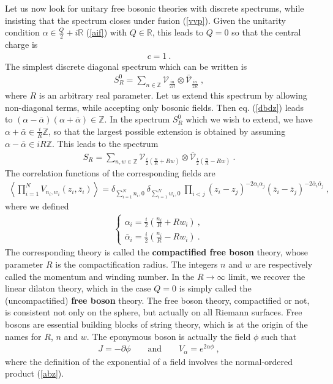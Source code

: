 \documentclass[12pt,a4paper,notitlepage]{report}
\newcommand \la {\left\langle}
\newcommand \ra {\right\rangle}
\newcommand \bla {\left\{\begin{array}{l} }
\newcommand \ela {\end{array}\right. }
\newcommand \Z {\mathbb{Z}}
\newcommand \R {\mathbb{R}}
\newcommand \p {\partial}
\numberwithin{equation}{section}
\theoremstyle{break}
\begin{document}
Let us now look for unitary free bosonic theories with discrete spectrums, while insisting that the spectrum closes under fusion (\ref{vvp}). Given the unitarity condition $\alpha\in \frac{Q}{2}+i\R$ (\ref{aif}) with $Q\in \R$, this leads to $Q=0$ so that the central charge is 
\begin{align}
 c=1\ .
\end{align}
The simplest discrete diagonal spectrum which can be written is 
\begin{align}
 S_R^0=\sum_{n\in\Z} \mathcal{V}_{\frac{in}{2R}}\otimes \bar{\mathcal{V}}_{\frac{in}{2R}}\ ,
\end{align}
where $R$ is an arbitrary real parameter. Let us extend this spectrum by allowing non-diagonal terms, while accepting only bosonic fields. Then eq. (\ref{dbdz}) leads to $(\alpha-\bar{\alpha})(\alpha+\bar{\alpha})\in \Z$. In the spectrum $S_R^0$ which we wish to extend, we have $\alpha+\bar{\alpha}\in\frac{i}{R}\Z$, so that the largest possible extension is obtained by assuming $\alpha-\bar{\alpha}\in iR\Z$. This leads to the spectrum
\begin{align}
 \boxed{S_R = \sum_{n,w\in \Z} \mathcal{V}_{\frac{i}{2}\left(\frac{n}{R} + Rw\right)} \otimes \bar{\mathcal{V}}_{\frac{i}{2}\left(\frac{n}{R} - Rw\right)} }\ .
\label{sr}
\end{align}
The correlation functions of the corresponding fields are 
\begin{align}
 \la \prod_{i=1}^N V_{n_i,w_i}(z_i,\bar{z}_i) \ra = \delta_{\sum_{i=1}^N n_i,0}\ \delta_{\sum_{i=1}^N w_i,0}\ \prod_{i<j} (z_i-z_j)^{-2\alpha_i\alpha_j}(\bar{z}_i-\bar{z}_j)^{-2\bar{\alpha}_i\bar{\alpha}_j}\ , 
\end{align}
where we defined
\begin{align}
\bla \alpha_i = \frac{i}{2}\left(\frac{n_i}{R} + Rw_i \right)\ , \\ \bar{\alpha}_i = \frac{i}{2}\left(\frac{n_i}{R} - Rw_i \right) \ . \ela
\end{align}
The corresponding theory is called the \textbf{\boldmath compactified free boson} theory, whose parameter $R$ is  the compactification radius. The integers $n$ and $w$ are respectively called the momentum and winding number. In the $R\rightarrow \infty$ limit, we recover the linear dilaton theory, which in the case $Q=0$ is simply called the (uncompactified) \textbf{\boldmath free boson} theory. 
The free boson theory, compactified or not, is consistent not only on the sphere, but actually on all Riemann surfaces. Free bosons are essential building blocks of string theory, which is at the origin of the names for $R$, $n$ and $w$. The eponymous boson is actually the field $\phi$ such that 
\begin{align}
 J = -\p \phi \qquad \text{and} \qquad V_\alpha = e^{2\alpha\phi}\ ,
\label{jpf}
\end{align}
where the definition of the exponential of a field involves the normal-ordered product (\ref{abz}). 
\end{document}

